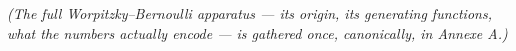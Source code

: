 % 
% 
% 
% 
% 
\textit{(The full Worpitzky--Bernoulli apparatus --- its origin, its generating functions, what the numbers actually encode --- is gathered once, canonically, in Annexe A.)}

